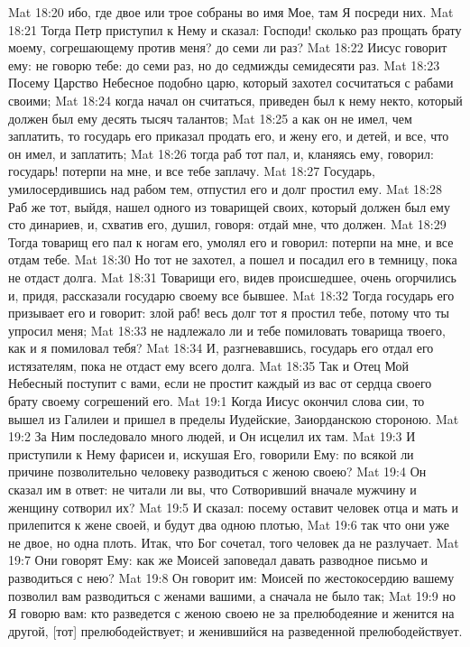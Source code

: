 Mat 18:20  ибо, где двое или трое собраны во имя Мое, там Я посреди них.
Mat 18:21  Тогда Петр приступил к Нему и сказал: Господи! сколько раз прощать брату моему, согрешающему против меня? до семи ли раз?
Mat 18:22  Иисус говорит ему: не говорю тебе: до семи раз, но до седмижды семидесяти раз.
Mat 18:23  Посему Царство Небесное подобно царю, который захотел сосчитаться с рабами своими;
Mat 18:24  когда начал он считаться, приведен был к нему некто, который должен был ему десять тысяч талантов;
Mat 18:25  а как он не имел, чем заплатить, то государь его приказал продать его, и жену его, и детей, и все, что он имел, и заплатить;
Mat 18:26  тогда раб тот пал, и, кланяясь ему, говорил: государь! потерпи на мне, и все тебе заплачу.
Mat 18:27  Государь, умилосердившись над рабом тем, отпустил его и долг простил ему.
Mat 18:28  Раб же тот, выйдя, нашел одного из товарищей своих, который должен был ему сто динариев, и, схватив его, душил, говоря: отдай мне, что должен.
Mat 18:29  Тогда товарищ его пал к ногам его, умолял его и говорил: потерпи на мне, и все отдам тебе.
Mat 18:30  Но тот не захотел, а пошел и посадил его в темницу, пока не отдаст долга.
Mat 18:31  Товарищи его, видев происшедшее, очень огорчились и, придя, рассказали государю своему все бывшее.
Mat 18:32  Тогда государь его призывает его и говорит: злой раб! весь долг тот я простил тебе, потому что ты упросил меня;
Mat 18:33  не надлежало ли и тебе помиловать товарища твоего, как и я помиловал тебя?
Mat 18:34  И, разгневавшись, государь его отдал его истязателям, пока не отдаст ему всего долга.
Mat 18:35  Так и Отец Мой Небесный поступит с вами, если не простит каждый из вас от сердца своего брату своему согрешений его.
Mat 19:1  Когда Иисус окончил слова сии, то вышел из Галилеи и пришел в пределы Иудейские, Заиорданскою стороною.
Mat 19:2  За Ним последовало много людей, и Он исцелил их там.
Mat 19:3  И приступили к Нему фарисеи и, искушая Его, говорили Ему: по всякой ли причине позволительно человеку разводиться с женою своею?
Mat 19:4  Он сказал им в ответ: не читали ли вы, что Сотворивший вначале мужчину и женщину сотворил их?
Mat 19:5  И сказал: посему оставит человек отца и мать и прилепится к жене своей, и будут два одною плотью,
Mat 19:6  так что они уже не двое, но одна плоть. Итак, что Бог сочетал, того человек да не разлучает.
Mat 19:7  Они говорят Ему: как же Моисей заповедал давать разводное письмо и разводиться с нею?
Mat 19:8  Он говорит им: Моисей по жестокосердию вашему позволил вам разводиться с женами вашими, а сначала не было так;
Mat 19:9  но Я говорю вам: кто разведется с женою своею не за прелюбодеяние и женится на другой, [тот] прелюбодействует; и женившийся на разведенной прелюбодействует.
